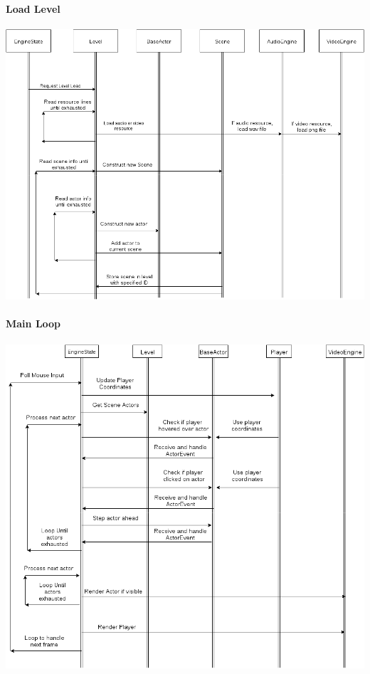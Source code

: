 \documentclass{article}
\begin{document}
			\paragraph{Load Level}
				\begin{center}
					\includegraphics[scale=0.3]{load-level}
				\end{center}
			\paragraph{Main Loop}
				\begin{center}
					\includegraphics[scale=0.3]{main-loop}
				\end{center}
%
%
\newpage
\end{document}
